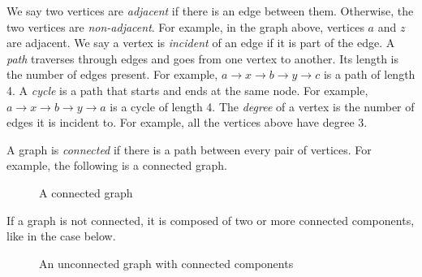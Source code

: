 \documentclass[a4paper, openany]{memoir}
\begin{document}
We say two vertices are \emph{adjacent} if there is an edge between them. Otherwise, the two vertices are \emph{non-adjacent}. For example, in the graph above, vertices $a$ and $z$ are adjacent. We say a vertex is \emph{incident} of an edge if it is part of the edge. A \emph{path} traverses through edges and goes from one vertex to another. Its length is the number of edges present. For example, $a \to x \to b \to y \to c$ is a path of length 4. A \emph{cycle} is a path that starts and ends at the same node. For example, $a \to x \to b \to y \to a$ is a cycle of length 4. The \emph{degree} of a vertex is the number of edges it is incident to. For example, all the vertices above have degree 3.

A graph is \emph{connected} if there is a path between every pair of vertices. For example, the following is a connected graph.
\begin{figure}[H]
    \centering
    \caption{A connected graph}
\end{figure}
\noindent If a graph is not connected, it is composed of two or more connected components, like in the case below.
\begin{figure}[H]
    \centering
    \caption{An unconnected graph with connected components}
    \label{fig:unconnected_forest}
\end{figure}
\end{document}

